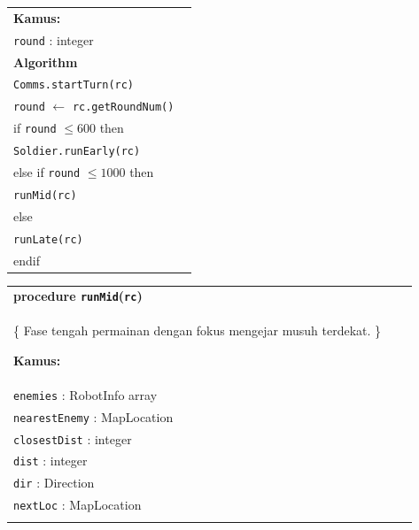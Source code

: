 \documentclass{article}
\newenvironment{pseudobox}
{
\centering
\begin{longtable}{|p{0.94\linewidth}|}
\hline
}
{
\\ \hline
\end{longtable}
\vspace{0.05cm}
}
\begin{document}
\begin{enumerate}[label=\alph*.]
\begin{pseudobox}
\textbf{Kamus:} \\
\hspace*{1.5em}\texttt{round} : integer \\

\textbf{Algorithm} \\

\hspace*{1.5em}\texttt{Comms.startTurn(rc)} \\

\hspace*{1.5em}\texttt{round} $\leftarrow$ \texttt{rc.getRoundNum()} \\

\hspace*{1.5em}if \texttt{round} $\leq 600$ then \\
\hspace*{3em}\texttt{Soldier.runEarly(rc)} \\

\hspace*{1.5em}else if \texttt{round} $\leq 1000$ then \\
\hspace*{3em}\texttt{runMid(rc)} \\

\hspace*{1.5em}else \\
\hspace*{3em}\texttt{runLate(rc)} \\
\hspace*{1.5em}endif
\end{pseudobox}

\begin{pseudobox}
\textbf{procedure \texttt{runMid}(\texttt{rc})} \\
\{ Fase tengah permainan dengan fokus mengejar musuh terdekat. \}

\textbf{Kamus:} \\
\hspace*{1.5em}\texttt{enemies} : RobotInfo array \\
\hspace*{1.5em}\texttt{nearestEnemy} : MapLocation \\
\hspace*{1.5em}\texttt{closestDist} : integer \\
\hspace*{1.5em}\texttt{dist} : integer \\
\hspace*{1.5em}\texttt{dir} : Direction \\
\hspace*{1.5em}\texttt{nextLoc} : MapLocation \\


\end{pseudobox}
\end{enumerate}
\end{document}
